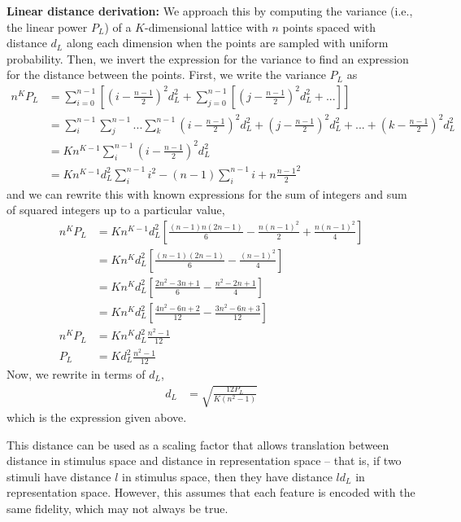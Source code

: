 \documentclass[letter,12pt]{article}
\begin{document}
\textbf{Linear distance derivation:}
We approach this by computing the variance (i.e., the linear power $P_{L}$)
of a $K$-dimensional lattice with $n$ points spaced with distance $d_{L}$ along
each dimension when the points are sampled with uniform probability. Then, we
invert the expression for the variance to find an expression for the distance
between the points. First, we write the variance $P_{L}$ as
\begin{align}
  n^{K} P_{L} &=  \sum_{i = 0}^{n - 1} \left[
    \left(i - \frac{n - 1}{2}\right)^{2}d_{L}^{2} + \sum_{j = 0}^{n - 1}
    \left[\left(j - \frac{n - 1}{2}\right)^{2}d_{L}^{2} + ... \right]\right] \\
  &= \sum_{i}^{n - 1} \sum_{j}^{n-1} ... \sum_{k}^{n - 1}
  \left(i - \frac{n - 1}{2}\right)^{2}d_{L}^{2} + 
  \left(j - \frac{n - 1}{2}\right)^{2}d_{L}^{2} + ... +
  \left(k - \frac{n - 1}{2}\right)^{2}d_{L}^{2} \\
  &= K n^{K - 1} \sum_{i}^{n - 1}
  \left(i - \frac{n - 1}{2}\right)^{2}d_{L}^{2} \\
  &= K n^{K - 1} d_{L}^{2}\sum_{i}^{n - 1} i^{2} - (n - 1) \sum_{i}^{n-1} i
  + n \frac{n - 1}{2}^{2}
\end{align}
and we can rewrite this with known expressions for the sum of integers
and sum of squared integers up to a particular value,
\begin{align}
  n^{K} P_{L} &= K n^{K - 1} d_{L}^{2}
  \left[\frac{(n - 1)n(2n - 1)}{6} - \frac{n(n - 1)^{2}}{2}
    + \frac{n(n - 1)^{2}}{4}\right] \\
  &= K n^{K} d_{L}^{2} \left[\frac{(n - 1)(2n - 1)}{6} - \frac{(n - 1)^{2}}{4}
    \right] \\
  &= K n^{K} d_{L}^{2} \left[\frac{2n^{2} - 3n + 1}{6}
    - \frac{n^{2} - 2n + 1}{4}\right] \\
  &= K n^{K} d_{L}^{2} \left[\frac{4n^{2} - 6n + 2}{12}
    - \frac{3n^{2} - 6n + 3}{12}\right] \\
  n^{K} P_{L} &= K n^{K} d_{L}^{2} \frac{n^{2} - 1}{12} \\
  P_{L} &= K d_{L}^{2} \frac{n^{2} - 1}{12} 
\end{align}
Now, we rewrite in terms of $d_{L}$,
\begin{align}
  d_{L} &= \sqrt{\frac{12 P_{L}}{K \left(n^{2} - 1\right)}}
\end{align}
which is the expression given above.

This distance can be used as a scaling factor that allows translation between
distance in stimulus space and distance in representation space -- that is,
if two stimuli have distance $l$ in stimulus space, then they have distance
$l d_{L}$ in representation space. However, this assumes that each feature is
encoded with the same fidelity, which may not always be true.
\end{document}
